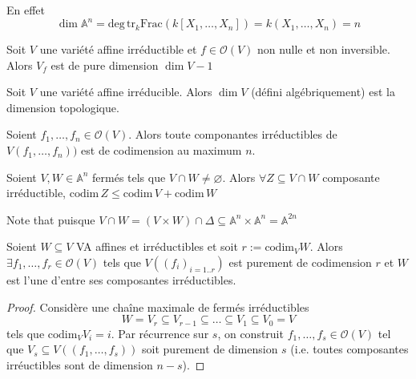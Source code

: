 \begin{example}{}
    En effet
    \[
      \dim \mathbb{A}^{n} = \mathrm{deg}\,\mathrm{tr}_k \mathrm{Frac}{\left(
      k[X_{1}, \dots, X_{n}] \right)} = k{(X_{1}, \dots, X_{n})} = n
    \]
\end{example}

\begin{theorem}{}
    Soit \(V\) une variété affine irréductible et \(f \in \mathcal{O}{(V)}\) non
    nulle et non inversible. Alors \(V_f\) est de pure dimension \(\dim V - 1\) 
\end{theorem}

\begin{corollary}{}
    Soit \(V\) une variété affine irréducible. Alors \(\dim V\) (défini
    algébriquement) est la dimension topologique.
\end{corollary}

\begin{corollary}{}
    Soient \(f_{1}, \dots, f_{n} \in \mathcal{O}{(V)}\). Alors toute componantes
    irréductibles de \(V{(f_{1}, \dots, f_{n}))}\) est de codimension au maximum \(n\).
\end{corollary}

\begin{corollary}{}
    Soient \(V, W \in \mathbb{A}^{n}\) fermés tels que \( V \cap W \neq
    \varnothing\). Alors \(\forall Z \subseteq V \cap W \) composante
    irréductible, \(\mathrm{codim}\,Z \le \mathrm{codim}\, V + \mathrm{codim}\,
    W\) 
\end{corollary}

Note that puisque \(V \cap W = {(V \times  W)} \cap \Delta \subseteq
\mathbb{A}^{n} \times  \mathbb{A}^{n} = \mathbb{A}^{2n} \) 

\begin{proposition}{}
    Soient \(W \subseteq V \) VA affines et irréductibles et soit \(r :=
    \mathrm{codim}_V W\). Alors \(\exists f_{1}, \dots, f_{r} \in
    \mathcal{O}{(V)}\) tels que \(V{({(f_{i})}_{i=1. .r} )}\) est purement de
    codimension \(r\) et \(W\) est l'une d'entre ses composantes irréductibles.
\end{proposition}

\begin{proof}{}
    Considère une chaîne maximale de fermés irréductibles
    \[
      W = V_r \subseteq V_{r-1} \subseteq \dots \subseteq V_{1} \subseteq V_{0}
      = V
    \]
    tels que \(\mathrm{codim}_V V_{i} = i\). Par récurrence sur \(s\), on
    construit \(f_{1}, \dots, f_s \in \mathcal{O}{(V)}\) tel que \(V_s \subseteq
    V{({(f_{1},\dots, f_s)})}\) soit purement de dimension \(s\) (i.e. toutes
    composantes irréuctibles sont de dimension \(n-s\)). %
\end{proof}


